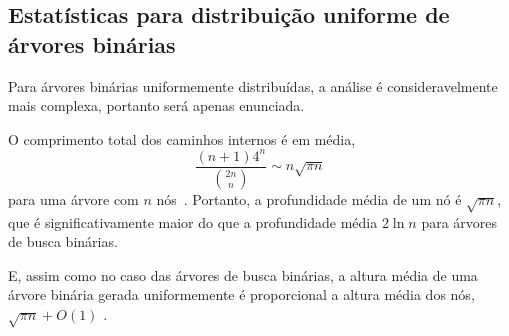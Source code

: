 \subsection{Estatísticas para distribuição uniforme de árvores binárias}

Para árvores binárias uniformemente distribuídas,
a análise é consideravelmente mais complexa,
portanto será apenas enunciada.

O comprimento total dos caminhos internos é
em média,
\begin{equation*}
    \frac{(n+1) 4^n}{\binom{2n}{n}} \sim n \sqrt{\pi n}
\end{equation*}
para uma árvore com $n$ nós~\cite[p.~288]{SedgewickFlajolet2013}.
Portanto,
a profundidade média de um nó é $\sqrt{\pi n}$,
que é significativamente maior do que a profundidade média $2 \ln n$
para árvores de busca binárias.

E, assim como no caso das árvores de busca binárias,
a altura média de uma árvore binária gerada uniformemente
é proporcional a altura média dos nós, $\sqrt{\pi n} + O(1)$
\cite[p.~306]{SedgewickFlajolet2013}.
